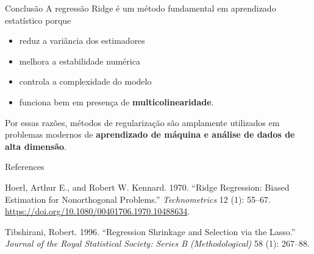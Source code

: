 \documentclass[
  ignorenonframetext,
  aspectratio=169,
]{beamer}
\newlength{\cslhangindent}
\newenvironment{CSLReferences}[2] %
 {\begin{list}{}{%
  \setlength{\itemindent}{0pt}
  \setlength{\leftmargin}{0pt}
  \setlength{\parsep}{0pt}
  \ifodd #1
   \setlength{\leftmargin}{\cslhangindent}
   \setlength{\itemindent}{-1\cslhangindent}
  \fi
  \setlength{\itemsep}{#2\baselineskip}}}
 {\end{list}}
\providecommand{\tightlist}{%
  \setlength{\itemsep}{0pt}\setlength{\parskip}{0pt}}
\begin{document}
\begin{frame}
\begin{block}{Conclusão}
\label{conclusuxe3o}
A regressão Ridge é um método fundamental em aprendizado estatístico
porque

\begin{itemize}
\tightlist
\item
  reduz a variância dos estimadores
\item
  melhora a estabilidade numérica
\item
  controla a complexidade do modelo
\item
  funciona bem em presença de \textbf{multicolinearidade}.
\end{itemize}

Por essas razões, métodos de regularização são amplamente utilizados em
problemas modernos de \textbf{aprendizado de máquina e análise de dados
de alta dimensão}.
\end{block}
\end{frame}

\begin{frame}{References}
\label{references}
\label{refs}
\begin{CSLReferences}{1}{0}
Hoerl, Arthur E., and Robert W. Kennard. 1970. {``Ridge Regression:
Biased Estimation for Nonorthogonal Problems.''} \emph{Technometrics} 12
(1): 55--67. \url{https://doi.org/10.1080/00401706.1970.10488634}.

Tibshirani, Robert. 1996. {``Regression Shrinkage and Selection via the
Lasso.''} \emph{Journal of the Royal Statistical Society: Series B
(Methodological)} 58 (1): 267--88.

\end{CSLReferences}
\end{frame}
\end{document}
